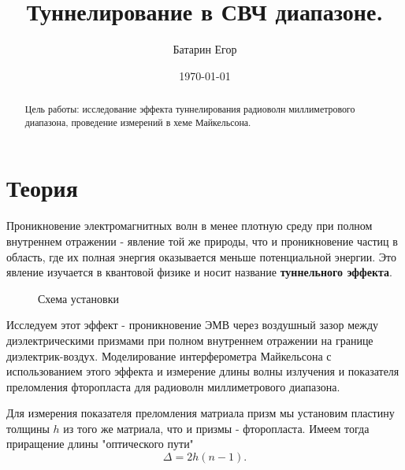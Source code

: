 \documentclass[a4paper,12pt]{article}
\author{Батарин Егор}
\title{Туннелирование в СВЧ диапазоне.}
\date{\today}
\theoremstyle{plain} %
\theoremstyle{definition} %
\theoremstyle{remark} %
\begin{document}
 
\maketitle
 
\begin{abstract}
   Цель работы: исследование эффекта туннелирования радиоволн миллиметрового диапазона, проведение измерений в хеме Майкельсона.
\end{abstract}
 
\section{Теория}

Проникновение электромагнитных волн в менее плотную среду при полном внутреннем отражении - явление той же природы, что и проникновение частиц в область, где их полная энергия оказывается меньше потенциальной энергии. Это явление изучается в квантовой физике и носит название \textbf{туннельного эффекта}. 

\begin{figure}[h!]
	\caption{Схема установки}
\end{figure}

Исследуем этот эффект - проникновение ЭМВ через воздушный зазор между диэлектрическими призмами при полном внутреннем отражении на границе диэлектрик-воздух. Моделирование интерферометра Майкельсона с использованием этого эффекта и измерение длины волны излучения и показателя преломления фторопласта для радиоволн миллиметрового диапазона. 

Для измерения показателя преломления матриала призм мы установим пластину толщины $h$ из того же матриала, что и призмы - фторопласта. Имеем тогда приращение длины "оптического пути" \[\Delta{} = 2h(n - 1).\]
\end{document}
